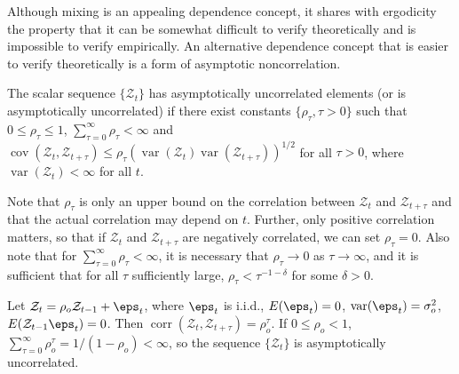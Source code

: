 Although mixing is an appealing dependence concept, it shares with ergodicity the property that it can be somewhat difficult to verify theoretically and is impossible to verify empirically. An alternative dependence concept that is easier to verify theoretically is a form of asymptotic noncorrelation.

\begin{definition}\label{def:asymp-uncorrelated}
The scalar sequence $\{\mathcal{Z}_t\}$ has asymptotically uncorrelated elements (or is asymptotically uncorrelated) if there exist constants $\{\rho_\tau, \tau > 0\}$ such that $0 \leq \rho_\tau \leq 1$, $\sum_{\tau=0}^{\infty} \rho_\tau < \infty$ and $\operatorname{cov}(\mathcal{Z}_t, \mathcal{Z}_{t+\tau}) \leq \rho_\tau (\operatorname{var}(\mathcal{Z}_t) \operatorname{var}(\mathcal{Z}_{t+\tau}))^{1/2}$ for all $\tau > 0$, where $\operatorname{var}(\mathcal{Z}_t) < \infty$ for all $t$.
\end{definition}

Note that $\rho_\tau$ is only an upper bound on the correlation between $\mathcal{Z}_t$ and $\mathcal{Z}_{t+\tau}$ and that the actual correlation may depend on $t$. Further, only positive correlation matters, so that if $\mathcal{Z}_t$ and $\mathcal{Z}_{t+\tau}$ are negatively correlated, we can set $\rho_\tau = 0$. Also note that for $\sum_{\tau=0}^{\infty} \rho_\tau < \infty$, it is necessary that $\rho_\tau \to 0$ as $\tau \to \infty$, and it is sufficient that for all $\tau$ sufficiently large, $\rho_\tau < \tau^{-1-\delta}$ for some $\delta > 0$.

\begin{example}\label{ex:ar1-asymp-uncorrelated}
Let $\mathcal{Z}_t = \rho_o \mathcal{Z}_{t-1} + \eps_t$, where $\eps_t$ is i.i.d., $E(\eps_t) = 0$, $\operatorname{var}(\eps_t) = \sigma_o^2$, $E(\mathcal{Z}_{t-1} \eps_t) = 0$. Then $\operatorname{corr}(\mathcal{Z}_t, \mathcal{Z}_{t+\tau}) = \rho_o^\tau$. If $0 \leq \rho_o < 1$, $\sum_{\tau=0}^{\infty} \rho_o^\tau = 1/(1-\rho_o) < \infty$, so the sequence $\{\mathcal{Z}_t\}$ is asymptotically uncorrelated.
\end{example}

